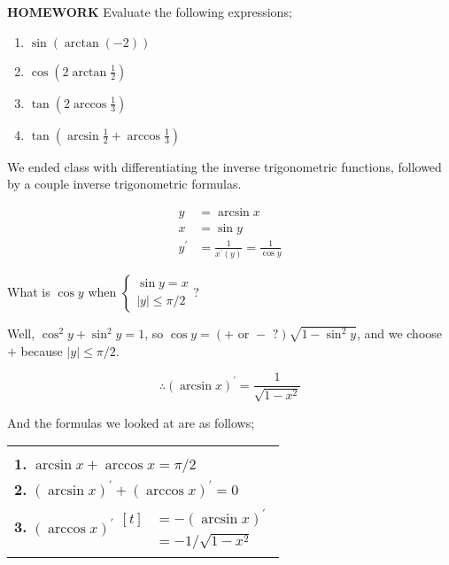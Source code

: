 \documentclass{article}
\begin{document}
{\bf{}HOMEWORK} Evaluate the following expressions;

\begin{enumerate}[label=\alph*)]
\item $\sin(\arctan(-2))$
\item $\cos(2\arctan\frac{1}{2})$
\item $\tan(2\arccos\frac{1}{3})$
\item $\tan(\arcsin\frac{1}{2}+\arccos\frac{1}{3})$
\end{enumerate}

\vspace{10pt}

We ended class with differentiating the inverse trigonometric functions, followed  by a couple inverse trigonometric formulas.

\begin{align*}
y&=\arcsin x\\
x&=\sin y\\
y^\prime&=\frac{1}{x^\prime(y)}=\frac{1}{\cos y}
\end{align*}

\vspace{10pt}

\begin{center}
What is $\cos y$ when $\left\{\begin{array}{c}\sin y=x\\|y|\leq\pi/2\end{array}\right.$?
\end{center}

\vspace{10pt}

Well, $\cos^2y+\sin^2y=1$, so $\cos y=(+\mbox{ or }-\mbox{ ?})\sqrt{1-\sin^2y}$, and we choose $+$ because $|y|\leq\pi/2$.

\[\therefore(\arcsin x)^\prime=\frac{1}{\sqrt{1-x^2}}\]

\vspace{10pt}

And the formulas we looked at are as follows;

\begin{center}
\begin{tabular}{|l|}
\hline\\
{\bf{}1.} $\arcsin x+\arccos x=\pi/2$\\[0.5em]
{\bf{}2.} $(\arcsin x)^\prime+(\arccos x)^\prime=0$\\[0.5em]
{\bf{}3.} $(\arccos x)^\prime\begin{aligned}[t]&=-(\arcsin x)^\prime\\&=-1/\sqrt{1-x^2}\end{aligned}$\\[1em]
\hline
\end{tabular}
\end{center}
\end{document}
